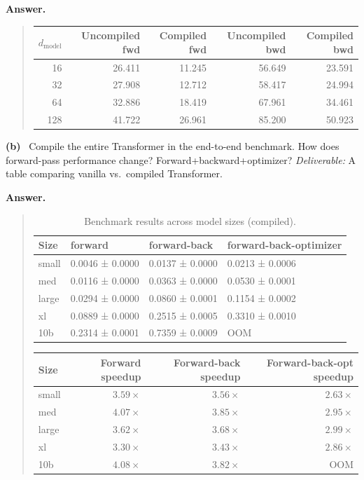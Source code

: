 \documentclass[11pt]{article}
\newcommand{\subq}[1]{\vspace{0.3em}\noindent\textbf{(#1)}\ }
\newcommand{\deliverable}[1]{\vspace{0.2em}\noindent\textit{Deliverable:} #1\par}
\newenvironment{answer}{%
  \vspace{0.3em}%
  \noindent\textbf{Answer.}\begin{quote}%
}{%
  \end{quote}\vspace{0.4em}%
}
\begin{document}
\begin{answer}
  \begin{center}
  \small
  \begin{tabular}{rrrrr}
    \toprule
    $d_{\text{model}}$ & Uncompiled fwd & Compiled fwd & Uncompiled bwd & Compiled bwd \\
    \midrule
    16  & 26.411 & 11.245 & 56.649 & 23.591 \\
    32  & 27.908 & 12.712 & 58.417 & 24.994 \\
    64  & 32.886 & 18.419 & 67.961 & 34.461 \\
    128 & 41.722 & 26.961 & 85.200 & 50.923 \\
    \bottomrule
  \end{tabular}
  \end{center}
\end{answer}

\subq{b} Compile the entire Transformer in the end-to-end benchmark. How does forward-pass performance change? Forward+backward+optimizer?
\deliverable{A table comparing vanilla vs.\ compiled Transformer.}
\begin{answer}
  \begin{table}[H]
    \center
    \caption{Benchmark results across model sizes (compiled).}
    \label{tab:compiled-model-benchmark-results}
    \begin{tabular}{llll}
    \toprule
    Size & forward & forward-back & forward-back-optimizer \\
    \midrule
    small & 0.0046 ± 0.0000 & 0.0137 ± 0.0000 & 0.0213 ± 0.0006 \\
    med & 0.0116 ± 0.0000 & 0.0363 ± 0.0000 & 0.0530 ± 0.0001 \\
    large & 0.0294 ± 0.0000 & 0.0860 ± 0.0001 & 0.1154 ± 0.0002 \\
    xl & 0.0889 ± 0.0000 & 0.2515 ± 0.0005 & 0.3310 ± 0.0010 \\
    10b & 0.2314 ± 0.0001 & 0.7359 ± 0.0009 & OOM \\
    \bottomrule
    \end{tabular}
    \end{table}    

    \begin{center}
      \small
      \begin{tabular}{lrrr}
      \toprule
      Size & Forward speedup & Forward-back speedup & Forward-back-opt speedup \\
      \midrule
      small & $3.59\times$ & $3.56\times$ & $2.63\times$ \\
      med   & $4.07\times$ & $3.85\times$ & $2.95\times$ \\
      large & $3.62\times$ & $3.68\times$ & $2.99\times$ \\
      xl    & $3.30\times$ & $3.43\times$ & $2.86\times$ \\
      10b   & $4.08\times$ & $3.82\times$ & OOM \\
      \bottomrule
      \end{tabular}
    \end{center}
\end{answer}
\end{document}
